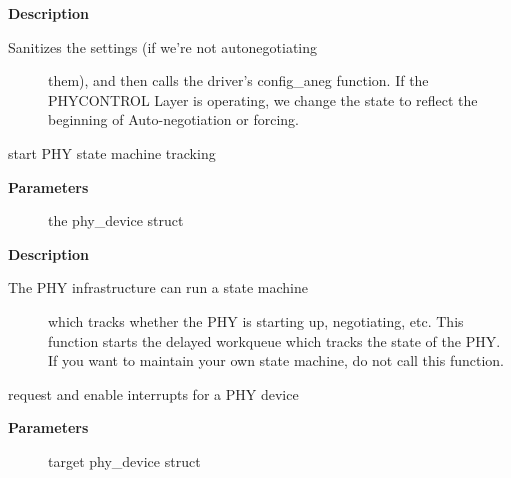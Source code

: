 \documentclass[a4paper,8pt,english]{sphinxmanual}
\begin{document}
\textbf{Description}
\begin{description}
\item[{Sanitizes the settings (if we're not autonegotiating}] \leavevmode
them), and then calls the driver's config\_aneg function.
If the PHYCONTROL Layer is operating, we change the state to
reflect the beginning of Auto-negotiation or forcing.

\end{description}

\begin{fulllineitems}
\label{networking/kapi:c.phy_start_machine}
start PHY state machine tracking

\end{fulllineitems}


\textbf{Parameters}
\begin{description}
\item[{}] \leavevmode
the phy\_device struct

\end{description}

\textbf{Description}
\begin{description}
\item[{The PHY infrastructure can run a state machine}] \leavevmode
which tracks whether the PHY is starting up, negotiating,
etc.  This function starts the delayed workqueue which tracks
the state of the PHY. If you want to maintain your own state machine,
do not call this function.

\end{description}

\begin{fulllineitems}
\label{networking/kapi:c.phy_start_interrupts}
request and enable interrupts for a PHY device

\end{fulllineitems}


\textbf{Parameters}
\begin{description}
\item[{}] \leavevmode
target phy\_device struct

\end{description}
\end{document}
